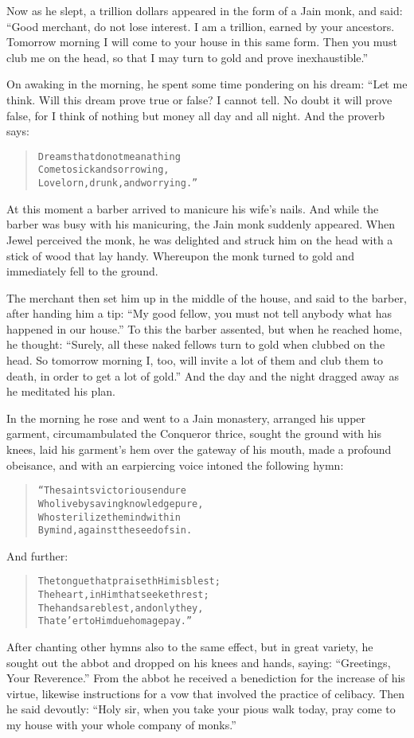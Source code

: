 \documentclass[article, twoside, 14pt]{memoir}
\renewenvironment{verbatim}{%
\begin{quote}%
\vskip -10pt%
\begin{alltt}\normalfont\large}{\end{alltt}%
\end{quote}%
\vskip -10pt
} %
\begin{document}
Now as he slept, a trillion dollars appeared in the form of a Jain
monk, and said:
``Good merchant, do not lose interest. I am a trillion, earned by your ancestors. Tomorrow morning I will come to your house in this same form. Then you must club me on the head, so that I may turn to gold and prove inexhaustible.''

On awaking in the morning, he spent some time pondering on his
dream: “Let me think. Will this dream prove true or false? I cannot
tell. No doubt it will prove false, for I think of nothing but
money all day and all night. And the proverb says:

\begin{verbatim}
Dreams that do not mean a thing
Come to sick and sorrowing,
Lovelorn, drunk, and worrying.”
\end{verbatim}
At this moment a barber arrived to manicure his wife's nails. And
while the barber was busy with his manicuring, the Jain monk
suddenly appeared. When Jewel perceived the monk, he was delighted
and struck him on the head with a stick of wood that lay handy.
Whereupon the monk turned to gold and immediately fell to the
ground.

The merchant then set him up in the middle of the house, and said
to the barber, after handing him a tip:
``My good fellow, you must not tell anybody what has happened in our house.''
To this the barber assented, but when he reached home, he thought:
``Surely, all these naked fellows turn to gold when clubbed on the head. So tomorrow morning I, too, will invite a lot of them and club them to death, in order to get a lot of gold.''
And the day and the night dragged away as he meditated his plan.

In the morning he rose and went to a Jain monastery, arranged his
upper garment, circumambulated the Conqueror thrice, sought the
ground with his knees, laid his garment's hem over the gateway of
his mouth, made a profound obeisance, and with an earpiercing voice
intoned the following hymn:

\begin{verbatim}
“The saints victorious endure
Who live by saving knowledge pure,
Who sterilize the mind within
By mind, against the seed of sin.
\end{verbatim}
And further:

\begin{verbatim}
The tongue that praiseth Him is blest;
The heart, in Him that seeketh rest;
The hands are blest, and only they,
That e'er to Him due homage pay.”
\end{verbatim}
After chanting other hymns also to the same effect, but in great
variety, he sought out the abbot and dropped on his knees and
hands, saying: ``Greetings, Your Reverence.'' From the abbot he
received a benediction for the increase of his virtue, likewise
instructions for a vow that involved the practice of celibacy. Then
he said devoutly:
``Holy sir, when you take your pious walk today, pray come to my house with your whole company of monks.''
\end{document}
